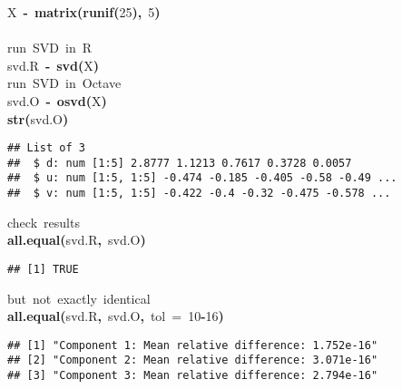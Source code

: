 \documentclass[english,10pt,a4paper]{article}\usepackage{graphicx, color}
\makeatletter
\newcommand{\hlnumber}[1]{\textcolor[rgb]{0,0,0}{#1}}%
\newcommand{\hlfunctioncall}[1]{\textcolor[rgb]{0.501960784313725,0,0.329411764705882}{\textbf{#1}}}%
\newcommand{\hlkeyword}[1]{\textcolor[rgb]{0,0,0}{\textbf{#1}}}%
\newcommand{\hlargument}[1]{\textcolor[rgb]{0.690196078431373,0.250980392156863,0.0196078431372549}{#1}}%
\newcommand{\hlcomment}[1]{\textcolor[rgb]{0.180392156862745,0.6,0.341176470588235}{#1}}%
\newcommand{\hlassignement}[1]{\textcolor[rgb]{0,0,0}{\textbf{#1}}}%
\newcommand{\hlsymbol}[1]{\textcolor[rgb]{0,0,0}{#1}}%
\newcommand{\hlstd}[1]{\textcolor[rgb]{0,0,0}{#1}}%
\newenvironment{kframe}{%
 \def\FrameCommand##1{\hskip\@totalleftmargin \hskip-\fboxsep
 \colorbox{shadecolor}{##1}\hskip-\fboxsep
     \hskip-\linewidth \hskip-\@totalleftmargin \hskip\columnwidth}%
 \MakeFramed {\advance\hsize-\width
   \@totalleftmargin\z@ \linewidth\hsize
   \@setminipage}}%
 {\par\unskip\endMakeFramed}
\newenvironment{knitrout}{}{} %
\makeatother
\begin{document}
\begin{knitrout}
\begin{kframe}
\begin{flushleft}
\hlstd{}\hlsymbol{X}{\ }\hlassignement{\usebox{\hlnormalsizeboxlessthan}-}{\ }\hlfunctioncall{matrix}\hlkeyword{(}\hlfunctioncall{runif}\hlkeyword{(}\hlnumber{25}\hlkeyword{)}\hlkeyword{,}{\ }\hlnumber{5}\hlkeyword{)}\hspace*{\fill}\\
\hlstd{}\hspace*{\fill}\\
\hlstd{}\hlcomment{\usebox{\hlnormalsizeboxhash}{\ }run{\ }SVD{\ }in{\ }R}\hspace*{\fill}\\
\hlstd{}\hlsymbol{svd.R}{\ }\hlassignement{\usebox{\hlnormalsizeboxlessthan}-}{\ }\hlfunctioncall{svd}\hlkeyword{(}\hlsymbol{X}\hlkeyword{)}\hspace*{\fill}\\
\hlstd{}\hlcomment{\usebox{\hlnormalsizeboxhash}{\ }run{\ }SVD{\ }in{\ }Octave}\hspace*{\fill}\\
\hlstd{}\hlsymbol{svd.O}{\ }\hlassignement{\usebox{\hlnormalsizeboxlessthan}-}{\ }\hlfunctioncall{o\usebox{\hlnormalsizeboxunderscore}svd}\hlkeyword{(}\hlsymbol{X}\hlkeyword{)}\hspace*{\fill}\\
\hlstd{}\hlfunctioncall{str}\hlkeyword{(}\hlsymbol{svd.O}\hlkeyword{)}\mbox{}
\normalfont
\end{flushleft}
\begin{verbatim}
## List of 3
##  $ d: num [1:5] 2.8777 1.1213 0.7617 0.3728 0.0057
##  $ u: num [1:5, 1:5] -0.474 -0.185 -0.405 -0.58 -0.49 ...
##  $ v: num [1:5, 1:5] -0.422 -0.4 -0.32 -0.475 -0.578 ...
\end{verbatim}
\begin{flushleft}
\ttfamily\noindent
\hlcomment{\usebox{\hlnormalsizeboxhash}{\ }check{\ }results}\hspace*{\fill}\\
\hlstd{}\hlfunctioncall{all.equal}\hlkeyword{(}\hlsymbol{svd.R}\hlkeyword{,}{\ }\hlsymbol{svd.O}\hlkeyword{)}\mbox{}
\normalfont
\end{flushleft}
\begin{verbatim}
## [1] TRUE
\end{verbatim}
\begin{flushleft}
\ttfamily\noindent
\hlcomment{\usebox{\hlnormalsizeboxhash}{\ }but{\ }not{\ }exactly{\ }identical}\hspace*{\fill}\\
\hlstd{}\hlfunctioncall{all.equal}\hlkeyword{(}\hlsymbol{svd.R}\hlkeyword{,}{\ }\hlsymbol{svd.O}\hlkeyword{,}{\ }\hlargument{tol}{\ }\hlargument{=}{\ }\hlnumber{10}\hlkeyword{\usebox{\hlnormalsizeboxhat}}\hlkeyword{-}\hlnumber{16}\hlkeyword{)}\mbox{}
\normalfont
\end{flushleft}
\begin{verbatim}
## [1] "Component 1: Mean relative difference: 1.752e-16"
## [2] "Component 2: Mean relative difference: 3.071e-16"
## [3] "Component 3: Mean relative difference: 2.794e-16"
\end{verbatim}
\end{kframe}
\end{knitrout}
\end{document}
